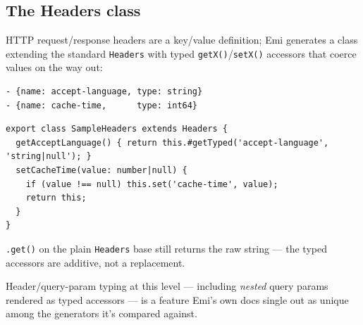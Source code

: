 \subsection{The Headers class}
HTTP request/response headers are a key/value definition; Emi generates a
class extending the standard \texttt{Headers} with typed
\texttt{getX()}/\texttt{setX()} accessors that coerce values on the way
out:
\begin{lstlisting}
- {name: accept-language, type: string}
- {name: cache-time,      type: int64}
\end{lstlisting}
\begin{lstlisting}
export class SampleHeaders extends Headers {
  getAcceptLanguage() { return this.#getTyped('accept-language', 'string|null'); }
  setCacheTime(value: number|null) {
    if (value !== null) this.set('cache-time', value);
    return this;
  }
}
\end{lstlisting}
\texttt{.get()} on the plain \texttt{Headers} base still returns the raw
string --- the typed accessors are additive, not a replacement.

\begin{pullquote}
Header/query-param typing at this level --- including \emph{nested} query
params rendered as typed accessors --- is a feature Emi's own docs single
out as unique among the generators it's compared against.
\end{pullquote}

